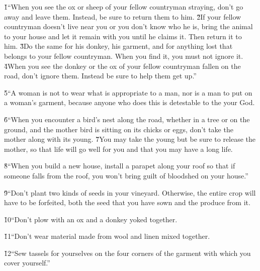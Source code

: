 \v{1}``When you see the ox or sheep of your fellow countryman straying, don't go away and leave them. Instead, be sure to return them to him. \v{2}If your fellow countryman doesn't live near you or you don't know who he is, bring the animal to your house and let it remain with you until he claims it. Then return it to him. \v{3}Do the same for his donkey, his garment, and for anything lost that belongs to your fellow countryman. When you find it, you must not ignore it. \v{4}When you see the donkey or the ox of your fellow countryman fallen on the road, don't ignore them. Instead be sure to help them get up.''

\v{5}``A woman is not to wear what is appropriate to a man, nor is a man to put on a woman's garment, because anyone who does this is detestable to the  your God.

\v{6}``When you encounter a bird's nest along the road, whether in a tree or on the ground, and the mother bird is sitting on its chicks or eggs, don't take the mother along with its young. \v{7}You may take the young but be sure to release the mother, so that life will go well for you and that you may have a long life.

\v{8}``When you build a new house, install a parapet along your roof so that if someone falls from the roof, you won't bring guilt of bloodshed on your house.''

\v{9}``Don't plant two kinds of seeds in your vineyard. Otherwise, the entire crop will have to be forfeited, both the seed that you have sown and the produce from it.

\v{10}``Don't plow with an ox and a donkey yoked together.

\v{11}``Don't wear material made from wool and linen mixed together.

\v{12}``Sew tassels for yourselves on the four corners of the garment with which you cover yourself.''

